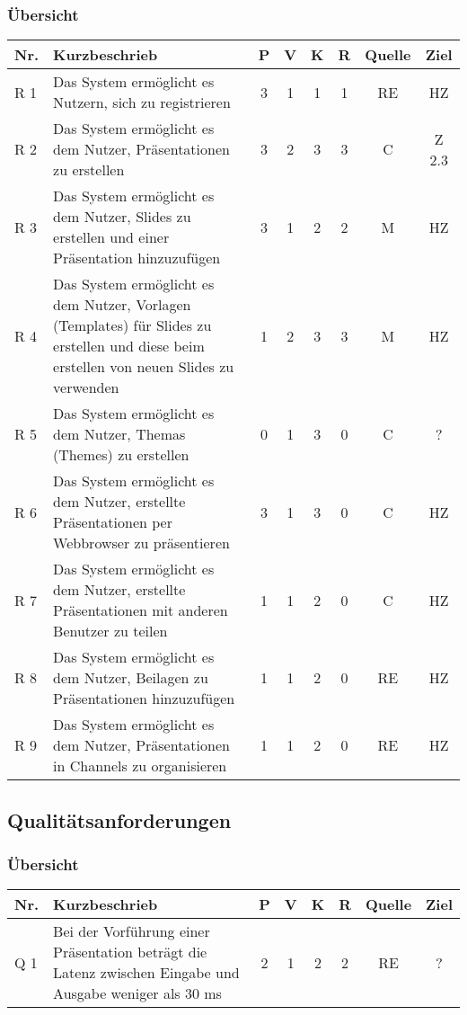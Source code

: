 \subsubsection{Übersicht}
\begingroup
\setlength{\tabcolsep}{10pt} %
\renewcommand{\arraystretch}{1.1}
\begin{tabularx}{\textwidth}{ |l|X|c|c|c|c|c|c| }
  \hline
	Nr.	&	Kurzbeschrieb	& 	P	& 	V	&	K	&	R	&	Quelle	&	Ziel	\\	\hline
	R 1	&	Das System ermöglicht es Nutzern, sich zu registrieren &	3	&	1	&	1	& 	1	&	RE	&	HZ	\\	\hline
	R 2	&	Das System ermöglicht es dem Nutzer, Präsentationen zu erstellen &	3	&	2	&	3	& 	3	&	C	&	Z 2.3	\\	\hline
	R 3	&	Das System ermöglicht es dem Nutzer, Slides zu erstellen und einer Präsentation hinzuzufügen &	3	&	1	&	2	&	2	&	M	&	HZ	\\ \hline
	R 4	&	Das System ermöglicht es dem Nutzer, Vorlagen (Templates) für Slides zu erstellen und diese beim erstellen von neuen Slides zu verwenden		&	1	&	2	& 	3	&	3	&	M	&	HZ	\\ \hline
	R 5	&	Das System ermöglicht es dem Nutzer, Themas (Themes) zu erstellen	&	0	& 	1	&	3	& 	0	&	C	&	? \\ \hline
	R 6	&	Das System ermöglicht es dem Nutzer, erstellte Präsentationen per Webbrowser zu präsentieren	&	3	& 	1	&	3	& 	0	&	C	&	HZ \\ \hline
	R 7	&	Das System ermöglicht es dem Nutzer, erstellte Präsentationen mit anderen Benutzer zu teilen	&	1	& 	1	&	2	& 	0	&	C	&	HZ \\ \hline
	R 8	&	Das System ermöglicht es dem Nutzer, Beilagen zu Präsentationen hinzuzufügen	&	1	& 	1	&	2	& 	0	&	RE	&	HZ \\ \hline
	R 9	&	Das System ermöglicht es dem Nutzer, Präsentationen in Channels zu organisieren	&	1	& 	1	&	2	& 	0	&	RE	&	HZ \\ \hline
\end{tabularx}
\endgroup

\subsection{Qualitätsanforderungen}

\subsubsection{Übersicht}
\begingroup
\setlength{\tabcolsep}{10pt} %
\renewcommand{\arraystretch}{1.5}
\begin{tabularx}{\textwidth}{ |l|X|c|c|c|c|c|c| }
  \hline
	Nr.	&	Kurzbeschrieb	& 	P	& 	V	&	K	&	R	&	Quelle	&	Ziel \\	\hline
	Q 1	&	Bei der Vorführung einer Präsentation beträgt die Latenz zwischen Eingabe und Ausgabe weniger als 30 ms	&	2	&	1	&	2	& 	2	&	RE	&	?	\\	\hline
\end{tabularx}
\endgroup
